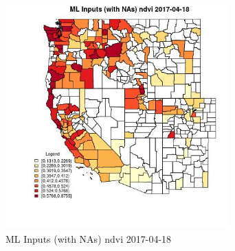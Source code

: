 \begin{figure} 
\centering  
\includegraphics[width=0.77\textwidth]{Code_Outputs/Report_ML_input_PM25_Step4_part_e_de_duplicated_aves_compiled_2019-05-20wNAs_CountyndviMean2017-04-18.jpg} 
\caption{\label{fig:Report_ML_input_PM25_Step4_part_e_de_duplicated_aves_compiled_2019-05-20wNAsCountyndviMean2017-04-18}ML Inputs (with NAs) ndvi 2017-04-18} 
\end{figure} 
 
